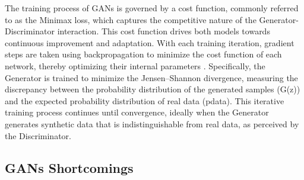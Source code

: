\documentclass[UKenglish,12pt]{master-style}
\begin{document}
The training process of GANs is governed by a cost function, commonly referred to as the Minimax loss, which captures the competitive nature of the Generator-Discriminator interaction. This cost function drives both models towards continuous improvement and adaptation. With each training iteration, gradient steps are taken using backpropagation to minimize the cost function of each network, thereby optimizing their internal parameters \cite{electronics10212689}. Specifically, the Generator is trained to minimize the Jensen–Shannon divergence, measuring the discrepancy between the probability distribution of the generated samples (G(z)) and the expected probability distribution of real data (pdata). This iterative training process continues until convergence, ideally when the Generator generates synthetic data that is indistinguishable from real data, as perceived by the Discriminator.

\subsection{GANs Shortcomings}
\end{document}
